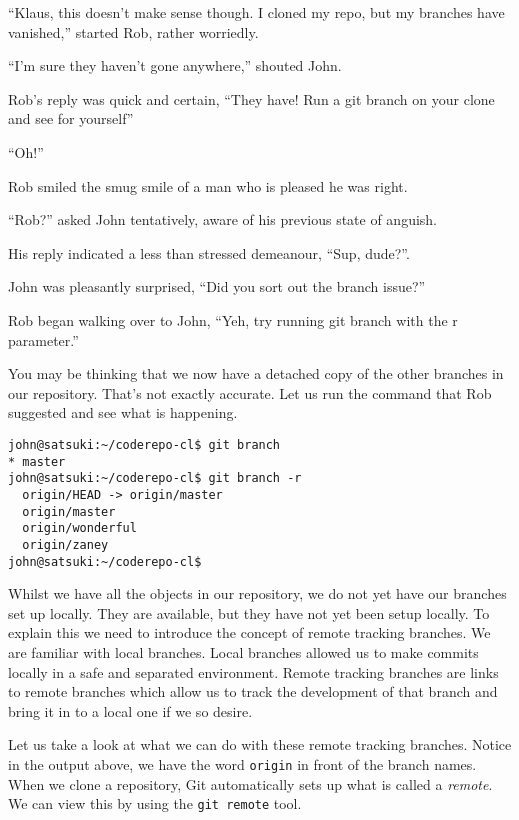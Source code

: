 \begin{trenches}
``Klaus, this doesn't make sense though.  I cloned my repo, but my branches have vanished,'' started Rob, rather worriedly.

``I'm sure they haven't gone anywhere,'' shouted John.  

Rob's reply was quick and certain, ``They have!  Run a git branch on your clone and see for yourself''

``Oh!''

Rob smiled the smug smile of a man who is pleased he was right.

\thoughtbreak

``Rob?'' asked John tentatively, aware of his previous state of anguish.

His reply indicated a less than stressed demeanour, ``Sup, dude?''.

John was pleasantly surprised, ``Did you sort out the branch issue?''

Rob began walking over to John, ``Yeh, try running git branch with the r parameter.''

\end{trenches}

You may be thinking that we now have a detached copy of the other branches in our repository.  That's not exactly accurate.  Let us run the command that Rob suggested and see what is happening.  

\begin{Verbatim}
john@satsuki:~/coderepo-cl$ git branch
* master
john@satsuki:~/coderepo-cl$ git branch -r
  origin/HEAD -> origin/master
  origin/master
  origin/wonderful
  origin/zaney
john@satsuki:~/coderepo-cl$ 
\end{Verbatim}

Whilst we have all the objects in our repository, we do not yet have our branches set up locally.  They are available, but they have not yet been setup locally.  To explain this we need to introduce the concept of remote tracking branches.  We are familiar with local branches.  Local branches allowed us to make commits locally in a safe and separated environment.  Remote tracking branches are links to remote branches which allow us to track the development of that branch and bring it in to a local one if we so desire.

Let us take a look at what we can do with these remote tracking branches.  Notice in the output above, we have the word \texttt{origin} in front of the branch names.  When we clone a repository, Git automatically sets up what is called a \emph{remote}.  We can view this by using the \texttt{git remote} tool.

